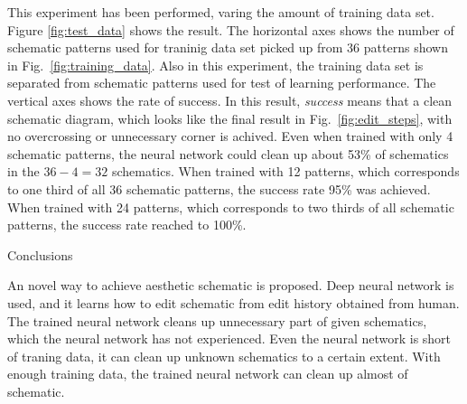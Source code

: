 \documentclass[twocolumn]{article}
\makeatletter
\def\section{\@startsection {section}{1}{\z@}{20pt plus 2pt minus 2pt}
{8pt plus 2pt minus 2pt}{\centering\normalsize\sc
\edef\@svsec{\thesection.\ }}}
\def\thesection{\Roman{section}}
\makeatother
\begin{document}
This experiment has been performed, varing the amount of training data set.
Figure \ref{fig:test_data} shows the result.
The horizontal axes shows the number of schematic patterns
used for traninig data set picked up from 36 patterns
shown in Fig.\ \ref{fig:training_data}.
Also in this experiment,
the training data set is separated from schematic patterns
used for test of learning performance.
The vertical axes shows the rate of success.
In this result, {\it success} means that a clean schematic diagram,
which looks like the final result in Fig.\ \ref{fig:edit_steps},
with no overcrossing or unnecessary corner is achived.
Even when trained with only 4 schematic patterns,
the neural network could clean up about 53\% of schematics
in the $36 - 4 = 32$ schematics.
When trained with 12 patterns,
which corresponds to one third of all 36 schematic patterns,
the success rate 95\% was achieved.
When trained with 24 patterns,
which corresponds to two thirds of all schematic patterns,
the success rate reached to 100\%.

\section{Conclusions}

An novel way to achieve aesthetic schematic is proposed.
Deep neural network is used, and it learns how to edit schematic
from edit history obtained from human.
The trained neural network cleans up unnecessary part of given schematics,
which the neural network has not experienced.
Even the neural network is short of traning data,
it can clean up unknown schematics to a certain extent.
With enough training data,
the trained neural network can clean up almost of schematic.

\end{document}
